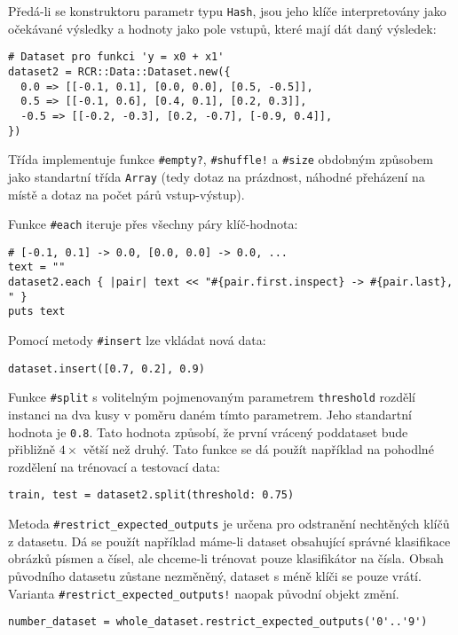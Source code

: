 \documentclass[a4paper]{article}
\begin{document}
Předá-li se konstruktoru parametr typu \texttt{Hash}, jsou jeho
klíče interpretovány jako očekávané výsledky a hodnoty jako
pole vstupů, které mají dát daný výsledek:
\begin{lstlisting}
# Dataset pro funkci 'y = x0 + x1'
dataset2 = RCR::Data::Dataset.new({
  0.0 => [[-0.1, 0.1], [0.0, 0.0], [0.5, -0.5]],
  0.5 => [[-0.1, 0.6], [0.4, 0.1], [0.2, 0.3]],
  -0.5 => [[-0.2, -0.3], [0.2, -0.7], [-0.9, 0.4]],
})
\end{lstlisting}

Třída implementuje funkce \texttt{\#empty?}, \texttt{\#shuffle!} a
\texttt{\#size} obdobným způsobem jako standartní třída \texttt{Array}
(tedy dotaz na prázdnost, náhodné přeházení na místě a dotaz na počet párů
vstup-výstup).

Funkce \texttt{\#each} iteruje přes všechny páry klíč-hodnota:
\begin{lstlisting}
# [-0.1, 0.1] -> 0.0, [0.0, 0.0] -> 0.0, ...
text = ""
dataset2.each { |pair| text << "#{pair.first.inspect} -> #{pair.last}, " }
puts text
\end{lstlisting}

Pomocí metody \texttt{\#insert} lze vkládat nová data:
\begin{lstlisting}
dataset.insert([0.7, 0.2], 0.9)
\end{lstlisting}

Funkce \texttt{\#split} s volitelným pojmenovaným parametrem \texttt{threshold}
rozdělí instanci na dva kusy v poměru daném tímto parametrem. Jeho standartní
hodnota je \texttt{0.8}. Tato hodnota způsobí, že první vrácený poddataset bude
přibližně $4\times$ větší než druhý.
Tato funkce se dá použít například na pohodlné rozdělení na trénovací a
testovací data:
\begin{lstlisting}
train, test = dataset2.split(threshold: 0.75)
\end{lstlisting}

Metoda \texttt{\#restrict\_expected\_outputs} je určena pro odstranění nechtěných klíčů
z datasetu. Dá se použít například máme-li dataset obsahující správné klasifikace
obrázků písmen a čísel, ale chceme-li trénovat pouze klasifikátor na čísla.
Obsah původního datasetu zůstane nezměněný, dataset s méně klíči se pouze vrátí.
Varianta \texttt{\#restrict\_expected\_outputs!} naopak původní objekt změní.
\begin{lstlisting}
number_dataset = whole_dataset.restrict_expected_outputs('0'..'9')
\end{lstlisting}
\end{document}
